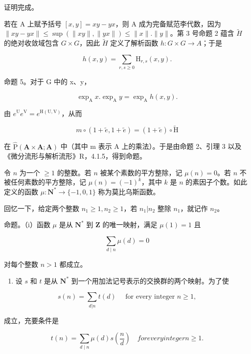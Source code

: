 证明完成。

若在 A 上赋予括号 \([x,y]=xy-yx\)，则 A 成为完备赋范李代数，因为 \(\|xy-yx\|\leqslant\sup(\|xy\|,\|yx\|)\leqslant\|x\|. \|y\|\)。第 3 号命题 2 蕴含 \(\tilde{H}\) 的绝对收敛域包含 \(G\times G\)，因此 \(\tilde{H}\) 定义了解析函数 \(h:G\times G\to A\)；于是

\[
h (x, y) = \sum_ {r, s \geqslant 0} \mathrm{H} _ {r, s} (x, y).\tag{25}
\]

命题 5。对于 G 中的 x、y，

\[
\exp_ {\mathrm{A}} x. \exp_ {\mathrm{A}} y = \exp_ {\mathrm{A}} h (x, y).\tag{26}
\]

由 \(e^{\mathrm{U}}e^{\mathrm{V}} = e^{\mathrm{H(U,V)}}\)，从而

\[
m \circ (1 + \tilde {e}, 1 + \tilde {e}) = (1 + \tilde {e}) \circ \tilde {\mathrm{H}}
\]

在 \(\hat{\mathrm{P}}(\mathbf{A} \times \mathbf{A}; \mathbf{A})\) 中（其中 m 表示 A 上的乘法）。于是由命题 2、引理 3 以及《微分流形与解析流形》R，4.1.5，得到命题。



  令 \(n\) 为一个 \(\geqslant 1\) 的整数。若 \(n\) 被某个素数的平方整除，记 \(\mu(n) = 0\)。若 \(n\) 不被任何素数的平方整除，记 \(\mu(n) = (-1)^k\)，其中 \(k\) 是 \(n\) 的素因子个数。如此定义的函数 \(\mu: \mathbf{N}^* \to \{-1, 0, 1\}\) 称为莫比乌斯函数。

回忆一下，给定两个整数 \(n_1 \geqslant 1, n_2 \geqslant 1\)，若 \(n_1|n_2\) 整除 \(n_1\)，就记作 \(n_2\)。

命题。（i）函数 \(\mu\) 是从 \(\mathbf{N}^*\) 到 \(\mathbf{Z}\) 的唯一映射，满足 \(\mu(1) = 1\) 且

\[
\sum_ {d \mid n} \mu (d) = 0\tag{1}
\]

对每个整数 \(n > 1\) 都成立。

\begin{enumerate}
\def\labelenumi{(\roman{enumi})}
\setcounter{enumi}{1}
\tightlist
\item
  设 \(s\) 和 \(t\) 是从 \(\mathbf{N}^*\) 到一个用加法记号表示的交换群的两个映射。为了使
\end{enumerate}

\[
s (n) = \sum_ {d | n} t (d) \quad \text { for   every   integer } n \geqslant 1,\tag{2}
\]

成立，充要条件是

\[
t (n) = \sum_ {d \mid n} \mu (d) s \left(\frac {n}{d}\right) \quad for every integer n \geqslant 1.\tag{3}
\]

